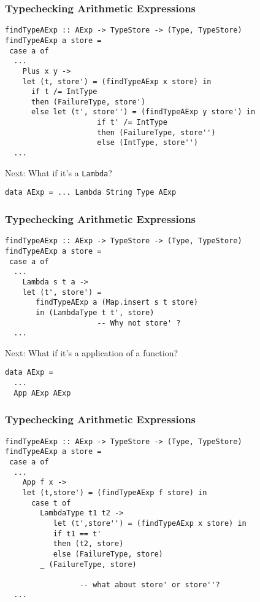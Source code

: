 \documentclass{beamer}
\begin{document}
\begin{frame}[fragile]
\frametitle{Typechecking Arithmetic Expressions}
\begin{verbatim}
findTypeAExp :: AExp -> TypeStore -> (Type, TypeStore)
findTypeAExp a store =
 case a of
  ...
    Plus x y -> 
    let (t, store') = (findTypeAExp x store) in
      if t /= IntType 
      then (FailureType, store')
      else let (t', store'') = (findTypeAExp y store') in
                     if t' /= IntType
                     then (FailureType, store'')
                     else (IntType, store'')
  ...
\end{verbatim}


\vfill
\pause

Next: What if it's a {\tt Lambda}?
\begin{verbatim}
data AExp = ... Lambda String Type AExp
\end{verbatim}
\end{frame}

\begin{frame}[fragile]
\frametitle{Typechecking Arithmetic Expressions}
\begin{verbatim}
findTypeAExp :: AExp -> TypeStore -> (Type, TypeStore)
findTypeAExp a store =
 case a of
  ...
    Lambda s t a -> 
    let (t', store') = 
       findTypeAExp a (Map.insert s t store) 
       in (LambdaType t t', store)                    
                     -- Why not store' ?
  ...
\end{verbatim}


\vfill
\pause

Next: What if it's a application of a function?
\begin{verbatim}
data AExp =
  ...
  App AExp AExp
\end{verbatim}
\end{frame}

\begin{frame}[fragile]
\frametitle{Typechecking Arithmetic Expressions}
\begin{verbatim}
findTypeAExp :: AExp -> TypeStore -> (Type, TypeStore)
findTypeAExp a store =
 case a of
  ...
    App f x -> 
    let (t,store') = (findTypeAExp f store) in
      case t of
        LambdaType t1 t2 -> 
           let (t',store'') = (findTypeAExp x store) in
           if t1 == t'
           then (t2, store)
           else (FailureType, store)
        _ (FailureType, store)
                 
                 -- what about store' or store''?
  ...
\end{verbatim}


\end{frame}
\end{document}
